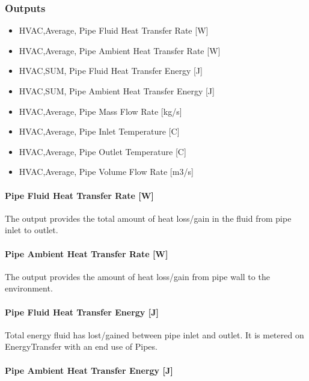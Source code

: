 \subsubsection{Outputs}\label{outputs-6-005}

\begin{itemize}
\item
  HVAC,Average, Pipe Fluid Heat Transfer Rate {[}W{]}
\item
  HVAC,Average, Pipe Ambient Heat Transfer Rate {[}W{]}
\item
  HVAC,SUM, Pipe Fluid Heat Transfer Energy {[}J{]}
\item
  HVAC,SUM, Pipe Ambient Heat Transfer Energy {[}J{]}
\item
  HVAC,Average, Pipe Mass Flow Rate {[}kg/s{]}
\item
  HVAC,Average, Pipe Inlet Temperature {[}C{]}
\item
  HVAC,Average, Pipe Outlet Temperature {[}C{]}
\item
  HVAC,Average, Pipe Volume Flow Rate {[}m3/s{]}
\end{itemize}

\paragraph{Pipe Fluid Heat Transfer Rate {[}W{]}}\label{pipe-fluid-heat-transfer-rate-w}

The output provides the total amount of heat loss/gain in the fluid from pipe inlet to outlet.

\paragraph{Pipe Ambient Heat Transfer Rate {[}W{]}}\label{pipe-ambient-heat-transfer-rate-w}

The output provides the amount of heat loss/gain from pipe wall to the environment.

\paragraph{Pipe Fluid Heat Transfer Energy {[}J{]}}\label{pipe-fluid-heat-transfer-energy-j}

Total energy fluid has lost/gained between pipe inlet and outlet. It is metered on EnergyTransfer with an end use of Pipes.

\paragraph{Pipe Ambient Heat Transfer Energy {[}J{]}}\label{pipe-ambient-heat-transfer-energy-j}

